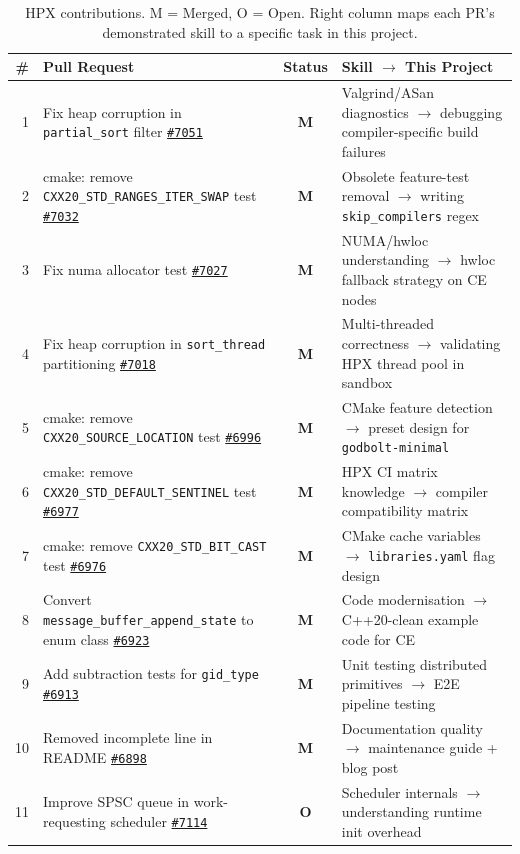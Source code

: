 \documentclass[11pt, a4paper]{article}
\newcommand{\code}[1]{\texttt{#1}}
\newcommand{\pr}[1]{\href{https://github.com/STEllAR-GROUP/hpx/pull/#1}{\texttt{\##1}}}
\begin{document}
\begin{table}[!htbp]
\centering\small
\begin{tabular}{@{}rp{6cm}cp{5cm}@{}}
\toprule
\textbf{\#} & \textbf{Pull Request} & \textbf{Status}
  & \textbf{Skill $\to$ This Project} \\
\midrule
\rowcolor{rowgray}
1  & Fix heap corruption in \code{partial\_sort} filter \pr{7051}
   & \textcolor{merged}{\bfseries M}
   & Valgrind/ASan diagnostics $\to$ debugging compiler-specific build failures \\
2  & cmake: remove \code{CXX20\_STD\_RANGES\_ITER\_SWAP} test \pr{7032}
   & \textcolor{merged}{\bfseries M}
   & Obsolete feature-test removal $\to$ writing \code{skip\_compilers} regex \\
\rowcolor{rowgray}
3  & Fix numa allocator test \pr{7027}
   & \textcolor{merged}{\bfseries M}
   & NUMA/hwloc understanding $\to$ hwloc fallback strategy on CE nodes \\
4  & Fix heap corruption in \code{sort\_thread} partitioning \pr{7018}
   & \textcolor{merged}{\bfseries M}
   & Multi-threaded correctness $\to$ validating HPX thread pool in sandbox \\
\rowcolor{rowgray}
5  & cmake: remove \code{CXX20\_SOURCE\_LOCATION} test \pr{6996}
   & \textcolor{merged}{\bfseries M}
   & CMake feature detection $\to$ preset design for \code{godbolt-minimal} \\
6  & cmake: remove \code{CXX20\_STD\_DEFAULT\_SENTINEL} test \pr{6977}
   & \textcolor{merged}{\bfseries M}
   & HPX CI matrix knowledge $\to$ compiler compatibility matrix \\
\rowcolor{rowgray}
7  & cmake: remove \code{CXX20\_STD\_BIT\_CAST} test \pr{6976}
   & \textcolor{merged}{\bfseries M}
   & CMake cache variables $\to$ \code{libraries.yaml} flag design \\
8  & Convert \code{message\_buffer\_append\_state} to enum class \pr{6923}
   & \textcolor{merged}{\bfseries M}
   & Code modernisation $\to$ C++20-clean example code for CE \\
\rowcolor{rowgray}
9  & Add subtraction tests for \code{gid\_type} \pr{6913}
   & \textcolor{merged}{\bfseries M}
   & Unit testing distributed primitives $\to$ E2E pipeline testing \\
10 & Removed incomplete line in README \pr{6898}
   & \textcolor{merged}{\bfseries M}
   & Documentation quality $\to$ maintenance guide + blog post \\
\rowcolor{rowgray}
11 & Improve SPSC queue in work-requesting scheduler \pr{7114}
   & \textcolor{openpr}{\bfseries O}
   & Scheduler internals $\to$ understanding runtime init overhead \\
\bottomrule
\end{tabular}
\caption{HPX contributions. M = Merged, O = Open. Right column maps each
  PR's demonstrated skill to a specific task in this project.}
\end{table}
\end{document}
